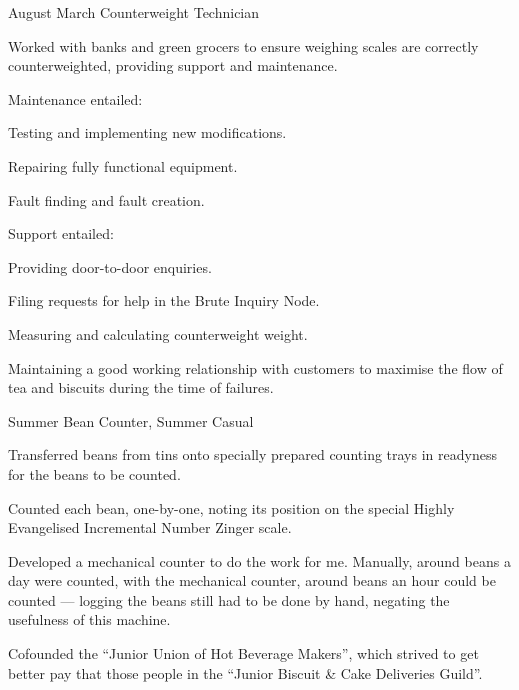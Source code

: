 \documentclass[10pt]{../bil-CV}
\begin{document}
\subsectionrule

{August }{March }
{Counterweight Technician}
\begin{compactlist}
	\item{Worked with banks and green grocers to ensure weighing scales are correctly counterweighted, providing support and maintenance.}
	\item{Maintenance entailed:}
	\begin{innercompactlist}
		\item{Testing and implementing new modifications.}
		\item{Repairing fully functional equipment.}
		\item{Fault finding and fault creation.}
	\end{innercompactlist}
	\item{Support entailed:}
	\begin{innercompactlist}
		\item{Providing door-to-door enquiries.}
		\item{Filing requests for help in the Brute Inquiry Node.}
		\item{Measuring and calculating counterweight weight.}
		\item{Maintaining a good working relationship with customers to maximise the flow of tea and biscuits during the time of failures.}
	\end{innercompactlist}
\end{compactlist}

\subsectionrule

{Summer }
{Bean Counter, Summer Casual}
\begin{compactlist}
	\item{Transferred beans from tins onto specially prepared counting trays in readyness for the beans to be counted.}
	\item{Counted each bean, one-by-one, noting its position on the special Highly Evangelised Incremental Number Zinger scale.}
	\item{Developed a mechanical counter to do the work for me.  Manually, around  beans a day were counted, with the mechanical counter, around  beans an hour could be counted --- logging the beans still had to be done by hand, negating the usefulness of this machine.}
	\item{Cofounded the ``Junior Union of Hot Beverage Makers'', which strived to get better pay that those people in the ``Junior Biscuit \& Cake Deliveries Guild''.}
\end{compactlist}
\end{document}
